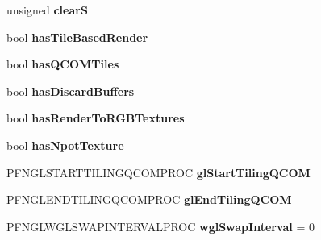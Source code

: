 \begin{DoxyCompactItemize}
\item 
\hypertarget{struct_tempest_1_1_opengl2x_1_1_device_a977f4013b19d7b7b63eba4385f424ad5}{unsigned {\bfseries clear\+S}}\label{struct_tempest_1_1_opengl2x_1_1_device_a977f4013b19d7b7b63eba4385f424ad5}

\item 
\hypertarget{struct_tempest_1_1_opengl2x_1_1_device_a0b52e50fbf947337b2133d61342cf642}{bool {\bfseries has\+Tile\+Based\+Render}}\label{struct_tempest_1_1_opengl2x_1_1_device_a0b52e50fbf947337b2133d61342cf642}

\item 
\hypertarget{struct_tempest_1_1_opengl2x_1_1_device_adec64f181282988b2779eb7f6b75d108}{bool {\bfseries has\+Q\+C\+O\+M\+Tiles}}\label{struct_tempest_1_1_opengl2x_1_1_device_adec64f181282988b2779eb7f6b75d108}

\item 
\hypertarget{struct_tempest_1_1_opengl2x_1_1_device_a8531fea0b114bb792cd5a6cfb3b8fdd2}{bool {\bfseries has\+Discard\+Buffers}}\label{struct_tempest_1_1_opengl2x_1_1_device_a8531fea0b114bb792cd5a6cfb3b8fdd2}

\item 
\hypertarget{struct_tempest_1_1_opengl2x_1_1_device_a065ca1046300c6f135a66949a57378ce}{bool {\bfseries has\+Render\+To\+R\+G\+B\+Textures}}\label{struct_tempest_1_1_opengl2x_1_1_device_a065ca1046300c6f135a66949a57378ce}

\item 
\hypertarget{struct_tempest_1_1_opengl2x_1_1_device_a5d88da6831d7a9ebb0723f45daf456f2}{bool {\bfseries has\+Npot\+Texture}}\label{struct_tempest_1_1_opengl2x_1_1_device_a5d88da6831d7a9ebb0723f45daf456f2}

\item 
\hypertarget{struct_tempest_1_1_opengl2x_1_1_device_aafb50e2b656ef5bd7301afa68d813f3d}{P\+F\+N\+G\+L\+S\+T\+A\+R\+T\+T\+I\+L\+I\+N\+G\+Q\+C\+O\+M\+P\+R\+O\+C {\bfseries gl\+Start\+Tiling\+Q\+C\+O\+M}}\label{struct_tempest_1_1_opengl2x_1_1_device_aafb50e2b656ef5bd7301afa68d813f3d}

\item 
\hypertarget{struct_tempest_1_1_opengl2x_1_1_device_a92594319e02082cb28446180cfa1d600}{P\+F\+N\+G\+L\+E\+N\+D\+T\+I\+L\+I\+N\+G\+Q\+C\+O\+M\+P\+R\+O\+C {\bfseries gl\+End\+Tiling\+Q\+C\+O\+M}}\label{struct_tempest_1_1_opengl2x_1_1_device_a92594319e02082cb28446180cfa1d600}

\item 
\hypertarget{struct_tempest_1_1_opengl2x_1_1_device_ae3fd05ed73096dfc828122051ded4e4d}{P\+F\+N\+G\+L\+W\+G\+L\+S\+W\+A\+P\+I\+N\+T\+E\+R\+V\+A\+L\+P\+R\+O\+C {\bfseries wgl\+Swap\+Interval} = 0}\label{struct_tempest_1_1_opengl2x_1_1_device_ae3fd05ed73096dfc828122051ded4e4d}


\end{DoxyCompactItemize}
